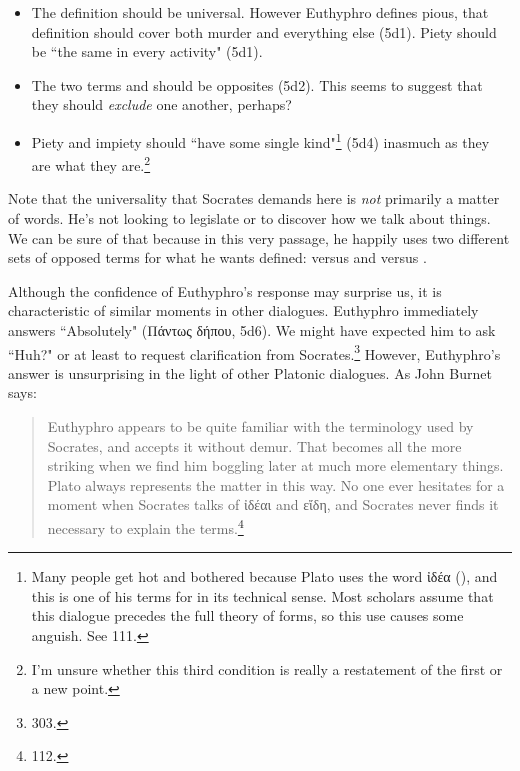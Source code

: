\documentclass[11pt]{article}
\begin{document}
\begin{itemize}
    \item The definition should be universal.  However Euthyphro defines pious, that definition should cover both murder and everything else (5d1).  Piety should be ``the same in every activity" (5d1).
    \item The two terms  and  should be opposites (5d2).  This seems to suggest that they should \emph{exclude} one another, perhaps?
    \item Piety and impiety should ``have some single kind"\footnote{Many people get hot and bothered because Plato uses the word ἰδέα (), and this is one of his terms for  in its technical sense.  Most scholars assume that this dialogue precedes the full theory of forms, so this use causes some anguish.  See \citet{burnet1924} 111.} (5d4) inasmuch as they are what they are.\footnote{I'm unsure whether this third condition is really a restatement of the first or a new point.}
\end{itemize}

Note that the universality that Socrates demands here is \emph{not} primarily a matter of words.  He's not looking to legislate or to discover how we talk about things.  We can be sure of that because in this very passage, he happily uses two different sets of opposed terms for what he wants defined:  versus  and  versus .

Although the confidence of Euthyphro's response may surprise us, it is characteristic of similar moments in other dialogues.  Euthyphro immediately answers ``Absolutely" (Πάντως δήπου, 5d6).  We might have expected him to ask ``Huh?" or at least to request clarification from Socrates.\footnote{\citet{nehamas1975} 303.}  However, Euthyphro's answer is unsurprising in the light of other Platonic dialogues.  As John Burnet says:

\begin{quote}
    Euthyphro appears to be quite familiar with the terminology used by Socrates, and accepts it without demur.  That becomes all the more striking when we find him boggling later at much more elementary things.  Plato always represents the matter in this way.  No one ever hesitates for a moment when Socrates talks of ἰδέαι and εἴδη, and Socrates never finds it necessary to explain the terms.\footnote{\citet{burnet1924} 112.}
\end{quote}
\end{document}
